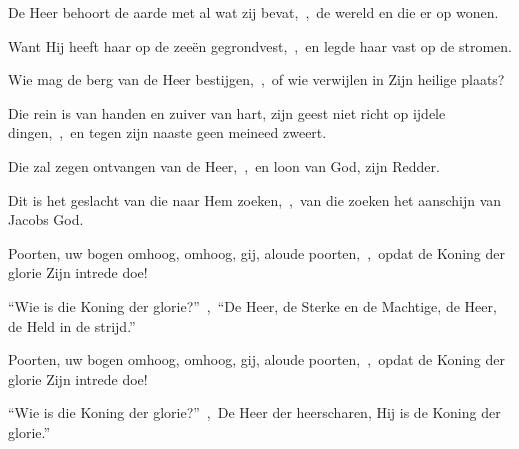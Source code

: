 \documentclass[12pt,twoside,a5paper]{article}
\begin{document}


\begin{halfparskip}
  De Heer behoort de aarde met al wat zij bevat,~\sep\ de wereld en die er op wonen.


  Want Hij heeft haar op de zeeën gegrondvest,~\sep\ en legde haar vast op de stromen.

  Wie mag de berg van de Heer bestijgen,~\sep\ of wie verwijlen in Zijn heilige plaats?

  Die rein is van handen en zuiver van hart, zijn geest niet richt op ijdele dingen,~\sep\ en tegen zijn naaste geen meineed zweert.

  Die zal zegen ontvangen van de Heer,~\sep\ en loon van God, zijn Redder.

  Dit is het geslacht van die naar Hem zoeken,~\sep\ van die zoeken het aanschijn van Jacobs God.
\end{halfparskip}


\begin{halfparskip}
  Poorten, uw bogen omhoog, omhoog, gij, aloude poorten,~\sep\ opdat de Koning der glorie Zijn intrede doe!

  ``Wie is die Koning der glorie?''~\sep\ ``De Heer, de Sterke en de Machtige, de Heer, de Held in de strijd.''

  Poorten, uw bogen omhoog, omhoog, gij, aloude poorten,~\sep\ opdat de Koning der glorie Zijn intrede doe!

  ``Wie is die Koning der glorie?''~\sep\ De Heer der heerscharen, Hij is de Koning der glorie.''
\end{halfparskip}




\end{document}
